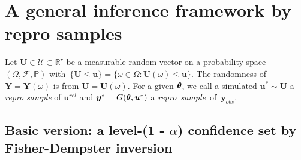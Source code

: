 \documentclass[12pt]{article}
\theoremstyle{shortspace}
\def\*#1{\bm{#1}}
\def\btheta{\mathop{\theta\kern-.45em\hbox{$\theta$}}\nolimits}
\def\P{\mathbb P}
\newcommand{\RR}{\mathbb{R}}
\begin{document}
\section{
A general inference framework by repro samples}
\label{sec:general}


Let  $\*U \in {\mathcal U} \subset \RR^r$ be a measurable random vector 
on a probability space $(\Omega, {\mathcal F}, \P)$ with~$\{ \*U \leq \*u\} = \{\omega \in \Omega: \*U(\omega) \leq \*u\}$. 
The randomness of $\*Y = \*Y(\omega)$ is from $\*U = \*U(\omega)$. 
For a given $\btheta$,  
we call a simulated $\*u^* \sim \*U$ a {\it repro sample} of $\*u^{rel}$ and
$\*y^* = G({\btheta}, \*u^*)$  
a {\it repro~sample}~of~$\*y_{obs}$. 


\subsection{\hspace{-3mm} Basic version: a level-(1 - $\alpha$) confidence set by Fisher-Dempster inversion}\label{sec:2.1}
\end{document}
